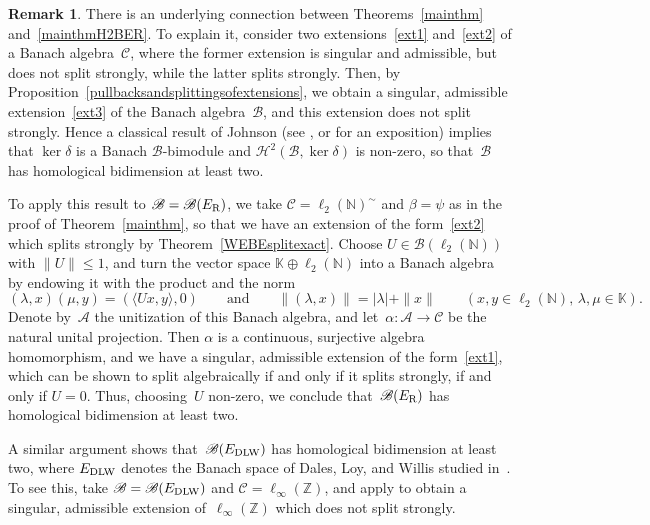 \documentclass[11pt,reqno]{amsart}
\theoremstyle{definition}
\newtheorem{remark}[theorem]{Remark}
\numberwithin{equation}{section}
\renewcommand{\le}{\ensuremath{\leqslant}}
\newcommand{\N}{\mathbb{N}}
\newcommand{\Z}{\mathbb{Z}}
\newcommand{\K}{\mathbb{K}}
\begin{document}
\begin{remark}
There is an underlying connection between Theorems~\ref{mainthm}
and~\ref{mainthmH2BER}. To explain it, consider two
extensions~\eqref{ext1} and~\eqref{ext2} of a Banach
algebra~$\mathscr{C}$, where the former extension is singular and
admissible, but does not split strongly, while the latter splits
strongly. Then, by
Proposition~\ref{pullbacksandsplittingsofextensions}, we obtain a
singular, admissible extension~\eqref{ext3} of the Banach
algebra~$\mathscr{B}$, and this extension does not split
strongly. Hence a classical result of Johnson (see
\cite[Theorem~2.1]{johnsonWed}, or \cite[Corollary~I.1.11]{helemskii}
for an exposition) implies that $\ker\delta$ is a Banach
$\mathscr{B}$-bimodule and $\mathscr{H}^2(\mathscr{B},\ker\delta)$ is
non-zero, so that~$\mathscr{B}$ has homological bidimension at least
two.

To apply this result to $\mathscr{B} =
\mathscr{B}(E_{\text{\normalfont{R}}})$, we take $\mathscr{C} =
\ell_2(\N)^{\sim}$ and $\beta = \psi$ as in the proof of
Theorem~\ref{mainthm}, so that we have an extension of the
form~\eqref{ext2} which splits strongly by
Theorem~\ref{WEBEsplitexact}. Choose $U\in\mathscr{B}(\ell_2(\N))$
with $\|U\|\le1$, and turn the vector space $\K\oplus\ell_2(\N)$ into
a Banach algebra by endowing it with the product and the norm
\[  (\lambda,x)(\mu,y) = (\langle Ux,y\rangle, 
0)\qquad\text{and}\qquad \|(\lambda,x)\| = |\lambda|+ \|x\|\qquad
(x,y\in\ell_2(\N),\,\lambda,\mu\in\K). \] Denote by~$\mathscr{A}$ the
unitization of this Banach algebra, and
let~$\alpha\colon\mathscr{A}\to\mathscr{C}$ be the natural unital
projection. Then $\alpha$ is a continuous, surjective algebra
homomorphism, and we have a singular, admissible extension of the
form~\eqref{ext1}, which can be shown to split algebraically if and
only if it splits strongly, if and only if $U=0$. Thus, choosing~$U$
non-zero, we conclude that~$\mathscr{B}(E_{\text{\normalfont{R}}})$
has homological bidimension at least two.

A similar argument shows
that~$\mathscr{B}(E_{\text{\normalfont{DLW}}})$ has homological
bidimension at least two, where $E_{\text{\normalfont{DLW}}}$ denotes
the Banach space of Dales, Loy, and Willis studied in~\cite{dlw}.  To
see this, take $\mathscr{B} =
\mathscr{B}(E_{\text{\normalfont{DLW}}})$ and $\mathscr{C} =
\ell_\infty(\Z)$, and apply \cite[Theorem~3.11(i)]{bdl} to obtain a
singular, admissible extension of~$\ell_\infty(\Z)$ which does not
split strongly.
\end{remark}
\end{document}
